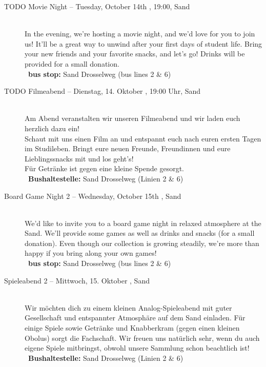\begin{description}
\ifml
    \item[TODO Movie Night -- Tuesday, October 14th \YEAR, 19:00, Sand]~\\%
    In the evening, we're hosting a movie night, and we'd love for you to join us!
    It'll be a great way to unwind after your first days of student life.
    Bring your new friends and your favorite snacks, and let's go!
    Drinks will be provided for a small donation.\\
    ~\textbf{bus stop:} Sand Drosselweg (bus lines 2 \& 6)
\else
    \item[TODO Filmeabend -- Dienstag, 14. Oktober \YEAR, 19:00 Uhr, Sand]~\\
    Am Abend veranstalten wir unseren Filmeabend und wir laden euch herzlich dazu ein!\\
    Schaut mit uns einen Film an und entspannt euch nach euren ersten Tagen im Studileben.
    Bringt eure neuen Freunde, Freundinnen und eure Lieblingssnacks mit und los geht's!\\
    Für Getränke ist gegen eine kleine Spende gesorgt.\\
    ~\textbf{Bushaltestelle:} Sand Drosselweg (Linien 2 \& 6)
\fi


\ifml
	\item[Board Game Night 2 -- Wednesday, October 15th \YEAR, Sand]~\\%
	We'd like to invite you to a board game night in relaxed atmosphere at the Sand.
	We'll provide some games as well as drinks and snacks (for a small donation).
	Even though our collection is growing steadily, we're more than happy if you bring along your own games!\\
	~\textbf{bus stop:} Sand Drosselweg (bus lines 2 \& 6)
\else
	\item[Spieleabend 2 -- Mittwoch, 15. Oktober \YEAR, Sand]~\\%
	Wir möchten dich zu einem kleinen Analog-Spieleabend mit guter Gesellschaft und entspannter Atmosphäre auf dem Sand einladen.
	Für einige Spiele sowie Getränke und Knabberkram (gegen einen kleinen Obolus) sorgt die Fachschaft.
	Wir freuen uns natürlich sehr, wenn du auch eigene Spiele mitbringst, obwohl unsere Sammlung schon beachtlich ist!\\
	~\textbf{Bushaltestelle:} Sand Drosselweg (Linien 2 \& 6)
\fi


\end{description}
